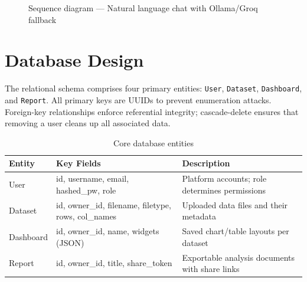 \documentclass[12pt,a4paper]{report}
\begin{document}
\begin{figure}[H]
\caption{Sequence diagram --- Natural language chat with Ollama/Groq fallback}
\label{fig:seq_chat}
\end{figure}

\section{Database Design}

The relational schema comprises four primary entities: \texttt{User}, \texttt{Dataset}, \texttt{Dashboard}, and \texttt{Report}. All primary keys are UUIDs to prevent enumeration attacks. Foreign-key relationships enforce referential integrity; cascade-delete ensures that removing a user cleans up all associated data.

\begin{table}[H]
\centering
\caption{Core database entities}
\begin{tabularx}{\textwidth}{llX}
\toprule
\textbf{Entity} & \textbf{Key Fields} & \textbf{Description} \\
\midrule
User      & id, username, email, hashed\_pw, role & Platform accounts; role determines permissions \\
Dataset   & id, owner\_id, filename, filetype, rows, col\_names & Uploaded data files and their metadata \\
Dashboard & id, owner\_id, name, widgets (JSON)   & Saved chart/table layouts per dataset \\
Report    & id, owner\_id, title, share\_token     & Exportable analysis documents with share links \\
\bottomrule
\end{tabularx}
\end{table}

\end{document}
